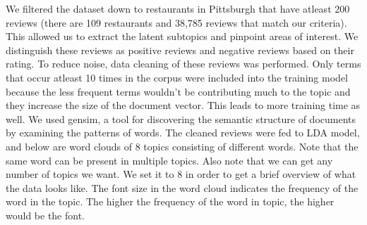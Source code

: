 \documentclass{neu_handout}
\begin{document}
We filtered the dataset down to restaurants in Pittsburgh that have atleast 200 reviews (there are 109 restaurants and 38,785 reviews that match our criteria). This allowed us to extract the latent subtopics and pinpoint areas of interest. We distinguish these reviews as positive reviews and negative reviews based on their rating. To reduce noise, data cleaning of these reviews was performed. Only terms that occur atleast 10 times in the corpus were included into the training model because the less frequent terms wouldn't be contributing much to the topic and they increase the size of the document vector. This leads to more training time as well. We used gensim, a tool for discovering the semantic structure of documents by examining the patterns of words. The cleaned reviews were fed to LDA model, and below are word clouds of 8 topics consisting of different words. Note that the same word can be present in multiple topics. Also note that we can get any number of topics we want. We set it to 8 in order to get a brief overview of what the data looks like. The font size in the word cloud indicates the frequency of the word in the topic. The higher the frequency of the word in topic, the higher would be the font.
\end{document}
